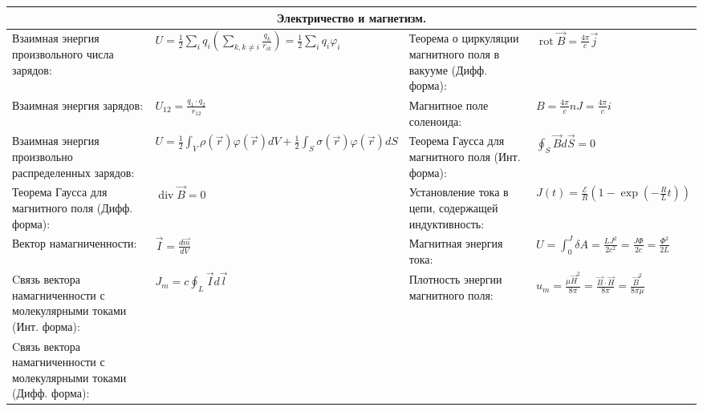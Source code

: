 \documentclass{article}
\begin{document}
\newpage

\begin{tabular}{ |p{6cm}|p{3.5cm}|p{6cm}|p{3.5cm}|  }
\hline
\multicolumn{4}{|c|}{Электричество и магнетизм.} \\
\hline
Взаимная энергия произвольного числа зарядов:                              &
$U=\frac{1}{2} \sum_{i} q_{i}\left(\sum_{k, k \neq i} \frac{q_{k}}{r_{i k}}\right)=\frac{1}{2} \sum_{i} q_{i} \varphi_{i}$                            &
Теорема о циркуляции магнитного поля в вакууме (Дифф. форма):              &
$\operatorname{rot} \vec{B}=\frac{4 \pi}{c} \vec{j}$                       \\
\hline
Взаимная энергия зарядов:                                                  &
$U_{12}=\frac {q_{1} \cdot q_{2}}{r_{12}}$                                 &
Магнитное поле соленоида:                                                  &
$B = \frac{4 \pi}{c} n J=\frac{4 \pi}{c} i$                                \\
\hline
Взаимная энергия произвольно распределенных зарядов:                       &
$U=\frac{1}{2} \int_{V} \rho(\vec{r}) \varphi(\vec{r}) d V+\frac{1}{2} \int_{S} \sigma(\vec{r}) \varphi(\vec{r}) d S$                                      &
Теорема Гаусса для магнитного поля (Инт. форма):                           &
$\oint_{S} \vec{B} d \vec{S}=0$                                            \\
\hline
Теорема Гаусса для магнитного поля (Дифф. форма):                          &
$\operatorname{div} \vec{B}=0$                                             &
Установление тока в цепи, содержащей индуктивность:                        &
$J(t)=\frac{\mathcal{E}}{R}\left(1-\exp \left(-\frac{R}{L} t\right)\right)$ \\
\hline
Вектор намагниченности:                                                    &
$\vec{I}=\frac{d \vec{m}}{d V}$                                            &
Магнитная энергия тока:                                                    &
$U=\int_{0}^{J} \delta A=\frac{L J^{2}}{2 c^{2}}=\frac{J \Phi}{2 c}=\frac{\Phi^{2}}{2 L}$\\
\hline
Cвязь вектора намагниченности с молекулярными токами (Инт. форма):         &
$J_{m}=c \oint_{L} \vec{I} d {\vec l}$                                     &
Плотность энергии магнитного поля:                                         &
$u_{m}=\frac{\mu \vec{H}^{2}}{8 \pi}=\frac{\vec{B} \cdot \vec{H}}{8 \pi}=\frac{\vec{B}^{2}}{8 \pi \mu}$ \\
\hline
Cвязь вектора намагниченности с молекулярными токами (Дифф. форма):        &

\end{tabular}
\end{document}
